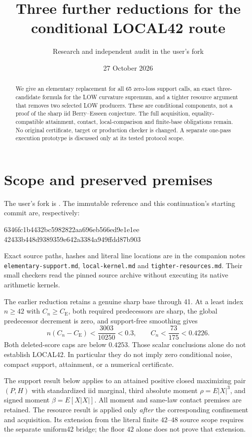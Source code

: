 \documentclass[11pt]{article}
\title{Three further reductions for the conditional LOCAL42 route}
\author{Research and independent audit in the user's fork}
\date{27 October 2026}
\newcommand{\CE}{C_{\mathrm E}}
\begin{document}
\maketitle
\begin{abstract}
We give an elementary replacement for all 65 zero-loss support calls, an
exact three-candidate formula for the LOW curvature supremum, and a tighter
resource argument that removes two selected LOW producers. These are
conditional components, not a proof of the sharp iid Berry--Esseen
conjecture. The full acquisition, equality-compatible attainment, contact,
local-comparison and finite-base obligations remain. No original certificate,
target or production checker is changed. A separate one-pass execution
prototype is discussed only at its tested protocol scope.
\end{abstract}

\section{Scope and preserved premises}
The user's fork is .
The immutable reference and this continuation's starting commit are,
respectively:
\begin{center}\small\ttfamily
6346fc1b4432bc5982822aa696eb566ed9e1e1ee\\
42433b448d9389359e642a3384a949ffdd87b903
\end{center}
Exact source paths, hashes
and literal line locations are in the companion notes
\texttt{elementary-support.md}, \texttt{local-kernel.md} and
\texttt{tighter-resources.md}. Their small checkers read the pinned source
archive without executing its native arithmetic kernels.

The earlier reduction retains a genuine sharp base through 41. At a least
index $n\ge42$ with $C_n\ge\CE$, both required predecessors are sharp,
the global predecessor decrement is zero, and support-free smoothing gives
\[
 n(C_n-\CE)<\frac{3003}{10250}<0.3,\qquad
 C_n<\frac{73}{175}<0.4226.
\]
Both deleted-score caps are below $0.4253$. Those scalar conclusions alone
do not establish LOCAL42. In particular they do not imply zero conditional
noise, compact support, attainment, or a numerical certificate.

The support result below applies to an attained positive closed maximizing
pair $(P,H)$ with standardized iid marginal, third absolute moment
$\rho=E|X|^3$, and signed moment $\beta=E[X|X|]$. All moment and same-law
contact premises are retained. The resource result is applied only
\emph{after} the corresponding confinement and acquisition. Its extension
from the literal finite $42$--$48$ source scope requires the separate
uniform42 bridge; the floor $42$ alone does not prove that extension.
\end{document}
